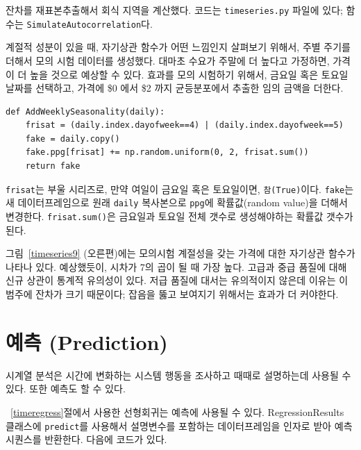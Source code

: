 잔차를 재표본추출해서 회식 지역을 계산했다. 코드는 {\tt timeseries.py} 파일에 있다; 함수는 {\tt SimulateAutocorrelation}다.

계절적 성분이 있을 때, 자기상관 함수가 어떤 느낌인지 살펴보기 위해서, 주별 주기를 더해서 모의 시험 데이터를 생성했다. 대마초 수요가 주말에 더 높다고 가정하면, 가격이 더 높을 것으로 예상할 수 있다. 효과를 모의 시험하기 위해서, 금요일 혹은 토요일 날짜를 선택하고, 가격에 \$0 에서 \$2 까지 균등분포에서 추출한 임의 금액을 더한다.

\begin{verbatim}
def AddWeeklySeasonality(daily):
    frisat = (daily.index.dayofweek==4) | (daily.index.dayofweek==5)
    fake = daily.copy()
    fake.ppg[frisat] += np.random.uniform(0, 2, frisat.sum())
    return fake
\end{verbatim}

{\tt frisat}는 부울 시리즈로, 만약 여일이 금요일 혹은 토요일이면, {\tt 참(True)}이다. {\tt fake}는 새 데이터프레임으로 원래 {\tt daily} 복사본으로 {\tt ppg}에 확률값(random value)을 더해서 변경한다. {\tt frisat.sum()}은 금요일과 토요일 전체 갯수로 생성해야하는 확률값 갯수가 된다.


그림~\ref{timeseries9} (오른편)에는 모의시험 계절성을 갖는 가격에 대한 자기상관 함수가 나타나 있다. 예상했듯이, 시차가 7의 곱이 될 때 가장 높다. 고급과 중급 품질에 대해 신규 상관이 통계적 유의성이 있다. 저급 품질에 대서는 유의적이지 않은데 이유는 이 범주에 잔차가 크기 때문이다; 잡음을 뚫고 보여지기 위해서는 효과가 더 커야한다.
 


\section{예측 (Prediction)}  

시계열 분석은 시간에 변화하는 시스템 행동을 조사하고 때때로 설명하는데 사용될 수 있다. 또한 예측도 할 수 있다.

~\ref{timeregress}절에서 사용한 선형회귀는 예측에 사용될 수 있다.
RegressionResults 클래스에 {\tt predict}를 사용해서
설명변수를 포함하는 데이터프레임을 인자로 받아 예측 시퀀스를 반환한다.
다음에 코드가 있다.

